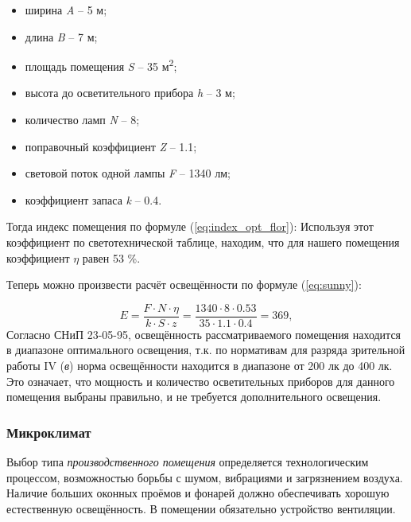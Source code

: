 \begin{itemize}
\item ширина \foreignlanguage{english}{\textit{A}} – \foreignlanguage{english}{5} м;
\item длина \foreignlanguage{english}{\textit{B}}\foreignlanguage{english}{ }– 7 м;
\item площадь помещения \foreignlanguage{english}{\textit{S}}\foreignlanguage{english}{ }– 35 м\textsuperscript{2};
\item высота до осветительного прибора \foreignlanguage{english}{\textit{h}} – 3 м;
\item количество ламп \foreignlanguage{english}{\textit{N}} – 8;
\item поправочный коэффициент \foreignlanguage{english}{\textit{Z}} – 1.1;
\item световой поток одной лампы \foreignlanguage{english}{\textit{F}} – 1340 лм;
\item коэффициент запаса \foreignlanguage{english}{\textit{k}} – 0.4.
\end{itemize}
Тогда индекс помещения по формуле (\ref{eq:index_opt_flor}):
Используя этот коэффициент по светотехнической таблице, находим, что для нашего помещения коэффициент \textit{$\eta $ }равен 53 \%.

Теперь можно произвести расчёт освещённости по формуле (\ref{eq:sunny}):

$$
E=\dfrac{F\cdot N \cdot \eta}{k \cdot S \cdot z} = \dfrac{1340{\cdot}8{\cdot}0.53}{35{\cdot}1.1{\cdot}0.4}=369,
$$
Согласно СНиП 23-05-95, освещённость рассматриваемого помещения находится в диапазоне оптимального освещения, т.к. по нормативам для разряда зрительной работы \foreignlanguage{english}{IV} (\textit{в}) норма освещённости находится в диапазоне от 200 лк до 400 лк. Это означает, что мощность и количество осветительных приборов для данного помещения выбраны правильно, и не требуется дополнительного освещения.
\subsubsection{Микроклимат}

Выбор типа \textit{производственного помещения} определяется технологическим процессом, возможностью борьбы с шумом, вибрациями и загрязнением воздуха. Наличие больших оконных проёмов и фонарей должно обеспечивать хорошую естественную освещённость. В помещении обязательно устройство вентиляции.

